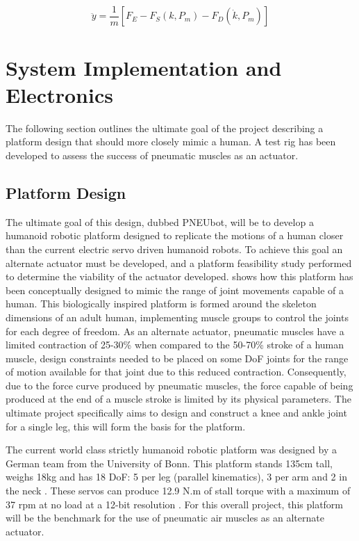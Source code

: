 \documentclass[11pt,a4paper]{article}
\begin{document}
\begin{equation}
    \ddot{y} = \frac{1}{m}[F_E-F_S(k,P_m)-F_D(\dot{k},P_m)]
    \label{math:dynamicforce}
\end{equation}

\clearpage
\section{System Implementation and Electronics}
\label{sec:system_implementation}

The following section outlines the ultimate goal of the project describing a platform design that should more closely mimic a human. A test rig has been developed to assess the success of pneumatic muscles as an actuator.

\subsection{Platform Design}
\label{sub:platform_design}

The ultimate goal of this design, dubbed PNEUbot, will be to develop a humanoid robotic platform designed to replicate the motions of a human closer than the current electric servo driven humanoid robots. To achieve this goal an alternate actuator must be developed, and a platform feasibility study performed to determine the viability of the actuator developed.  shows how this platform has been conceptually designed to mimic the range of joint movements capable of a human. This biologically inspired platform is formed around the skeleton dimensions of an adult human, implementing muscle groups to control the joints for each degree of freedom. As an alternate actuator, pneumatic muscles have a limited contraction of 25-30\% when compared to the 50-70\% stroke of a human muscle, design constraints needed to be placed on some DoF joints for the range of motion available for that joint due to this reduced contraction. Consequently, due to the force curve produced by pneumatic muscles, the force capable of being produced at the end of a muscle stroke is limited by its physical parameters. The ultimate project specifically aims to design and construct a knee and ankle joint for a single leg, this will form the basis for the platform.\newline

The current world class strictly humanoid robotic platform was designed by a German team from the University of Bonn. This platform stands 135cm tall, weighs 18kg and has 18 DoF: 5 per leg (parallel kinematics), 3 per arm and 2 in the neck \cite{ficht_farazi_brandenburger_rodriguez_pavlichenko_allgeuer_hosseini_behnke_2018}. These servos can produce 12.9 N.m of stall torque with a maximum of 37 rpm at no load at a 12-bit resolution \cite{robotis}. For this overall project, this platform will be the benchmark for the use of pneumatic air muscles as an alternate actuator. \newline
\end{document}
